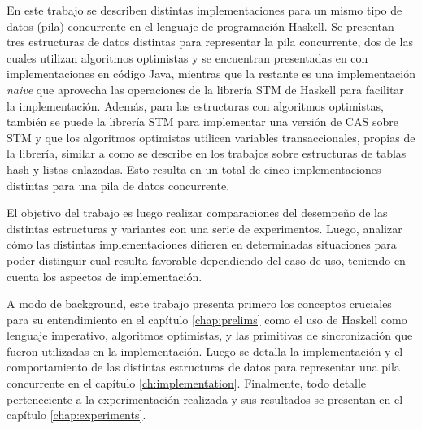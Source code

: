 En este trabajo se describen distintas implementaciones para un mismo tipo de datos (pila) concurrente en el lenguaje de programación Haskell. Se presentan tres estructuras de datos distintas para representar la pila concurrente, dos de las cuales utilizan algoritmos optimistas y se encuentran presentadas en \cite{shavit} con implementaciones en código Java, mientras que la restante es una implementación \emph{naive} que aprovecha las operaciones de la librería STM de Haskell para facilitar la implementación.
Además, para las estructuras con algoritmos optimistas, también se puede la librería STM para implementar una versión de CAS sobre STM y que los algoritmos optimistas utilicen variables transaccionales, propias de la librería, similar a como se describe en los trabajos \cite{hash} \cite{linked-list} sobre estructuras de tablas hash y listas enlazadas.
Esto resulta en un total de cinco implementaciones distintas para una pila de datos concurrente.

El objetivo del trabajo es luego realizar comparaciones del desempeño de las distintas estructuras y variantes con una serie de experimentos. Luego, analizar cómo las distintas implementaciones difieren en determinadas situaciones para poder distinguir cual resulta favorable dependiendo del caso de uso, teniendo en cuenta los aspectos de implementación.

A modo de background, este trabajo presenta primero los conceptos cruciales para su entendimiento en el capítulo \ref{chap:prelims} como el uso de Haskell como lenguaje imperativo, algoritmos optimistas, y las primitivas de sincronización que fueron utilizadas en la implementación.
Luego se detalla la implementación y el comportamiento de las distintas estructuras de datos para representar una pila concurrente en el capítulo \ref{ch:implementation}. Finalmente, todo detalle perteneciente a la experimentación realizada y sus resultados se presentan en el capítulo \ref{chap:experiments}.